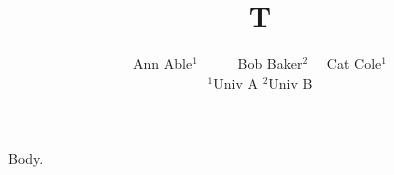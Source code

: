 \documentclass{article}
\title{T}
\author{Ann Able$^{1}$ \ \ \ \ \ Bob Baker$^{2}$ \ \ 
Cat Cole$^{1}$\\
$^1$Univ A \quad $^2$Univ B}
\begin{document}
\maketitle
Body.
\end{document}
